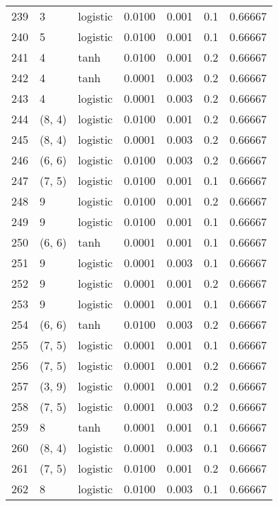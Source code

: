 \begin{tabular}{lllrrrr}
239 &           3 &  logistic &  0.0100 &  0.001 &  0.1 &   0.66667 \\
240 &           5 &  logistic &  0.0100 &  0.001 &  0.1 &   0.66667 \\
241 &           4 &      tanh &  0.0100 &  0.001 &  0.2 &   0.66667 \\
242 &           4 &      tanh &  0.0001 &  0.003 &  0.2 &   0.66667 \\
243 &           4 &  logistic &  0.0001 &  0.003 &  0.2 &   0.66667 \\
244 &      (8, 4) &  logistic &  0.0100 &  0.001 &  0.2 &   0.66667 \\
245 &      (8, 4) &  logistic &  0.0001 &  0.003 &  0.2 &   0.66667 \\
246 &      (6, 6) &  logistic &  0.0100 &  0.003 &  0.2 &   0.66667 \\
247 &      (7, 5) &  logistic &  0.0100 &  0.001 &  0.1 &   0.66667 \\
248 &           9 &  logistic &  0.0100 &  0.001 &  0.2 &   0.66667 \\
249 &           9 &  logistic &  0.0100 &  0.001 &  0.1 &   0.66667 \\
250 &      (6, 6) &      tanh &  0.0001 &  0.001 &  0.1 &   0.66667 \\
251 &           9 &  logistic &  0.0001 &  0.003 &  0.1 &   0.66667 \\
252 &           9 &  logistic &  0.0001 &  0.001 &  0.2 &   0.66667 \\
253 &           9 &  logistic &  0.0001 &  0.001 &  0.1 &   0.66667 \\
254 &      (6, 6) &      tanh &  0.0100 &  0.003 &  0.2 &   0.66667 \\
255 &      (7, 5) &  logistic &  0.0001 &  0.001 &  0.1 &   0.66667 \\
256 &      (7, 5) &  logistic &  0.0001 &  0.001 &  0.2 &   0.66667 \\
257 &      (3, 9) &  logistic &  0.0001 &  0.001 &  0.2 &   0.66667 \\
258 &      (7, 5) &  logistic &  0.0001 &  0.003 &  0.2 &   0.66667 \\
259 &           8 &      tanh &  0.0001 &  0.001 &  0.1 &   0.66667 \\
260 &      (8, 4) &  logistic &  0.0001 &  0.003 &  0.1 &   0.66667 \\
261 &      (7, 5) &  logistic &  0.0100 &  0.001 &  0.2 &   0.66667 \\
262 &           8 &  logistic &  0.0100 &  0.003 &  0.1 &   0.66667 \\

\end{tabular}
